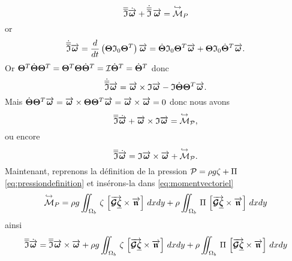 \begin{equation}
	\overline{\overline{\mathfrak{I}}}\dot{\overrightarrow{\boldsymbol{\omega}}} +  \dot{\overline{\overline{\mathfrak{I}}}}\, \overrightarrow{\boldsymbol{\omega}}  = \overset{\hookrightarrow}{\mathcal{M}}_P
\end{equation}
or 
\begin{equation}
	\dot{\overline{\overline{\mathfrak{I}}}}\overrightarrow{\boldsymbol{\omega}} = \frac{d}{dt}\left( \mathbf{\Theta} \mathfrak{I}_0\mathbf{\Theta}^{T}\right)\overrightarrow{\boldsymbol{\omega}} = \dot{\mathbf{\Theta}}\mathfrak{I}_0\mathbf{\Theta}^{T}\overrightarrow{\boldsymbol{\omega}} + \mathbf{\Theta}\mathfrak{I}_0\dot{\mathbf{\Theta}}^{T}\overrightarrow{\boldsymbol{\omega}}.
\end{equation}
Or $\mathbf{\Theta}^{T}\dot{\mathbf{\Theta}}\mathbf{\Theta}^{T} = \mathbf{\Theta}^{T}\mathbf{\Theta}\dot{\mathbf{\Theta}}^{T} = \mathcal{I} \dot{\mathbf{\Theta}}^{T} = \dot{\mathbf{\Theta}}^{T}$ donc
\begin{equation}
	\dot{\overline{\overline{\mathfrak{I}}}}\overrightarrow{\boldsymbol{\omega}} = \overrightarrow{\boldsymbol{\omega}}\times \mathfrak{I}\overrightarrow{\boldsymbol{\omega}} - \mathfrak{I}\dot{\mathbf{\Theta}}\mathbf{\Theta}^{T}\overrightarrow{\boldsymbol{\omega}}.
\end{equation}
Mais $\dot{\mathbf{\Theta}}\mathbf{\Theta}^{T}\overrightarrow{\boldsymbol{\omega}} = \overrightarrow{\boldsymbol{\omega}}\times \mathbf{\Theta}\mathbf{\Theta}^{T}\overrightarrow{\boldsymbol{\omega}} = \overrightarrow{\boldsymbol{\omega}}\times\overrightarrow{\boldsymbol{\omega}} = 0$ donc nous avons
\begin{equation}
	\overline{\overline{\mathfrak{I}}}\dot{\overrightarrow{\boldsymbol{\omega}}} + \overrightarrow{\boldsymbol{\omega}}\times \mathfrak{I}\overrightarrow{\boldsymbol{\omega}}  = \overset{\hookrightarrow}{\mathcal{M}}_\mathcal{P},
\end{equation}
ou encore
\begin{equation}
	\overline{\overline{\mathfrak{I}}}\dot{\overrightarrow{\boldsymbol{\omega}}} =  \mathfrak{I}\overrightarrow{\boldsymbol{\omega}}\times\overrightarrow{\boldsymbol{\omega}} + \overset{\hookrightarrow}{\mathcal{M}}_\mathcal{P}.
\end{equation}
\noindent Maintenant, reprenons la définition de la pression $\mathcal{P} = \rho g \zeta + \Pi$ \eqref{eq:pressiondefinition} et insérons-la dans \eqref{eq:momentvectoriel}
\begin{equation}
\overset{\hookrightarrow}{\mathcal{M}}_P = \rho g \iint_{\Omega_b}\,\zeta\, \left[\overrightarrow{\boldsymbol{\mathcal{G}\underline{\boldsymbol{\zeta}}}} \times \overrightarrow{\boldsymbol{\mathfrak{n}}}\right] \,dxdy + \rho \iint_{\Omega_b}\,\Pi\, \left[\overrightarrow{\boldsymbol{\mathcal{G}\underline{\boldsymbol{\zeta}}}} \times \overrightarrow{\boldsymbol{\mathfrak{n}}}\right] \,dxdy
\end{equation}
ainsi
\begin{equation}
	\overline{\overline{\mathfrak{I}}}\dot{\overrightarrow{\boldsymbol{\omega}}} =  \overline{\overline{\mathfrak{I}}}\overrightarrow{\boldsymbol{\omega}}\times\overrightarrow{\boldsymbol{\omega}} + \rho g \iint_{\Omega_b}\,\zeta\, \left[\overrightarrow{\boldsymbol{\mathcal{G}\underline{\boldsymbol{\zeta}}}} \times \overrightarrow{\boldsymbol{\mathfrak{n}}}\right] \,dxdy + \rho \iint_{\Omega_b}\,\Pi\, \left[\overrightarrow{\boldsymbol{\mathcal{G}\underline{\boldsymbol{\zeta}}}} \times \overrightarrow{\boldsymbol{\mathfrak{n}}}\right] \,dxdy\label{eq:momentumflotteur_1}
\end{equation}

